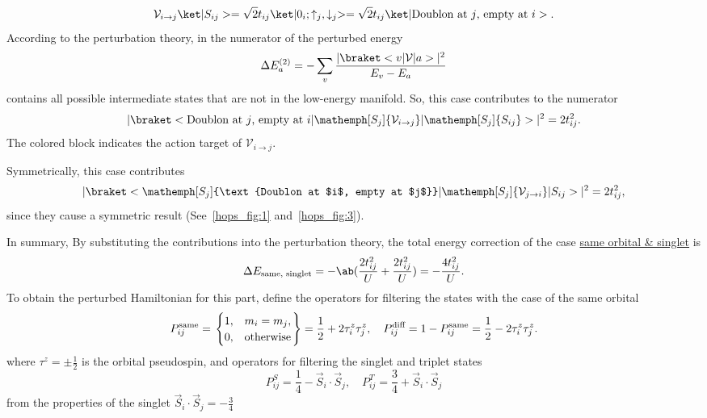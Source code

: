 \begin{solution}
\begin{enumext}[label = \Roman*.]
\begin{enumext}
\begin{enumext}[label = \arabic*.]
\[          \mathcal V_{i\to j} \ket|S_{ij}>
        = \sqrt2 t_{ij} \ket|0_i;\uparrow_j,\downarrow_j>
        = \sqrt2 t_{ij} \ket|\text{Doublon at $j$, empty at $i$}>.
        \]
        According to the perturbation theory, in the numerator of the perturbed
        energy
        \[
          \Delta E_a^{(2)}
        = -\sum_v \frac{|\braket<v|\mathcal V|a>|^2}{E_v - E_a}
        \]
        contains all possible intermediate states that are not in the low-energy
        manifold. So, this case contributes to the numerator
        \[
          |\braket<\text{Doublon at $j$, empty at $i$}|
          \mathemph[S_j]{\mathcal V_{i\to j}}|\mathemph[S_j]{S_{ij}}>|^2
        = 2t_{ij}^2.
        \]
        The colored block indicates the action target of $\mathcal V_{i\to j}$.
        \item Symmetrically, this case contributes
        \[
          |\braket<\mathemph[S_j]{\text{Doublon at $i$, empty at $j$}}|
          \mathemph[S_j]{\mathcal V_{j\to i}}|S_{ij}>|^2
        = 2t_{ij}^2,
        \]
        since they cause a symmetric result (See~\ref{hops_fig:1}
        and~\ref{hops_fig:3}).
      \end{enumext}
      In summary, By substituting the contributions into the perturbation
      theory, the total energy correction of the case
      \underline{same orbital \& singlet} is
      \begin{equation}
        \Delta E_\text{same, singlet}
        = -\ab(\frac{2t_{ij}^2}{U} + \frac{2t_{ij}^2}{U})
        = -\frac{4t_{ij}^2}{U}.
        \label{energy:same_orbital}
      \end{equation}
      To obtain the perturbed Hamiltonian for this part, define the operators
      for filtering the states with the case of the same orbital
      \[
        P_{ij}^\text{same} =
        \begin{rcases}
        \begin{cases}
          1, & m_i = m_j,\\
          0, & \text{otherwise}
        \end{cases}
        \end{rcases} = \frac12 + 2\tau_i^z \tau_j^z, \quad
        P_{ij}^\text{diff} = 1 - P_{ij}^\text{same}
      = \frac12 - 2\tau_i^z \tau_j^z.
      \]
      where $\tau^z = \pm\frac12$ is the orbital pseudospin, and operators for
      filtering the singlet and triplet states
      \[
        P_{ij}^S = \frac14 - \vec S_i \cdot \vec S_j, \quad
        P_{ij}^T = \frac34 + \vec S_i \cdot \vec S_j
      \]
      from the properties of the singlet $\vec S_i \cdot \vec S_j = -\frac34$

\end{enumext}
\end{enumext}
\end{solution}

